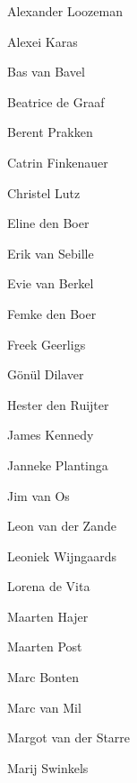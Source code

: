 \documentclass[smallauthor, chapterhaspagenum, nochapterinheader, pagenuminheader,  bigchapnum,medium2, tocpages,  garamond, titleinheader]{jote-book}
\begin{document}
	\begin{references}


		Alexander Loozeman

		Alexei Karas



		Bas van Bavel



		Beatrice de Graaf



		Berent Prakken



		Catrin Finkenauer



		Christel Lutz



		Eline den Boer



		Erik van Sebille



		Evie van Berkel



		Femke den Boer



		Freek Geerligs



		Gönül Dilaver



		Hester den Ruijter



		James Kennedy



		Janneke Plantinga



		Jim van Os



		Leon van der Zande



		Leoniek Wijngaards



		Lorena de Vita



		Maarten Hajer



		Maarten Post



		Marc Bonten



		Marc van Mil



		Margot van der Starre



		Marij Swinkels




\end{references}
\end{document}
